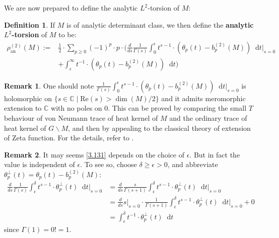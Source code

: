 \documentclass[11pt]{report}
\theoremstyle{definition}
\newtheorem{Def}{Definition}[chapter]
\newtheorem{Rmk}{Remark}[chapter]
\theoremstyle{plain}
\newcommand{\complex}{\mathbb{C}}
\newcommand{\mass}[1]{\mathop{}\mathrm{d}{#1}}
\renewcommand{\Re}{\mathrm{Re}}
\begin{document}
We are now prepared to define the analytic $L^2$-torsion of $M$:
\begin{Def}
	If $M$ is of analytic determinant class, we then define the \textbf{analytic $L^2$-torsion} of $M$ to be:
	\begin{equation}\label{3.131}
	\begin{split}
	\rho^{(2)}_{\mathrm{an}}(M):=&\frac{1}{2}\cdot \sum_{p\geq 0}(-1)^p\cdot p\cdot \Bigg(\frac{d}{ds}\frac{1}{\Gamma(s)}\int_{0}^{\epsilon}t^{s-1}\cdot \left(\theta_p(t)-b_p^{(2)}(M)\right)\mass{t}\Big|_{s=0}\\
	&+\int_{\epsilon}^{\infty}t^{-1}\cdot \left(\theta_p(t)-b_p^{(2)}(M)\right)\mass{t}\Bigg)
	\end{split}
	\end{equation}
\end{Def}
\begin{Rmk}
One should note $\frac{1}{\Gamma(s)}\int_{0}^{\epsilon}t^{s-1}\cdot \left(\theta_p(t)-b_p^{(2)}(M)\right)\mass{t}\Big|_{s=0}$ is holomorphic on $\{s\in \complex \mid \Re(s)>\dim(M)/2\}$ and it admits meromorphic extension to $\complex$ with no poles on $0$. This can be proved by comparing the small $T$ behaviour of von Neumann trace of heat kernel of $M$ and the ordinary trace of heat kernel of $G \backslash M$, and then by appealing to the classical theory of extension of Zeta function. For the details, refer to \cite[Lemma~3]{lott1992}.
\end{Rmk}
\begin{Rmk}
	It may seems \ref{3.131} depends on the choice of $\epsilon$. But in fact the value is independent of $\epsilon$. To see so, choose $\delta\geq \epsilon>0$, and abbreviate $\theta^\perp_p(t)=\theta_p(t)-b_p^{(2)}(M)$:
	\begin{equation*}
	\begin{split}
	\frac{d}{ds}\frac{1}{\Gamma(s)}\int_{\epsilon}^{\delta}t^{s-1}\cdot \theta_p^\perp(t)\mass{t}\Big|_{s=0}&=\frac{d}{ds}\frac{s}{\Gamma(s+1)}\int_{\epsilon}^{\delta}t^{s-1}\cdot \theta_p^\perp(t)\mass{t}\Big|_{s=0}\\
	&=\frac{d}{ds}s\Big|_{s=0}\cdot \frac{1}{\Gamma(s+1)}\int_{\epsilon}^{\delta}t^{s-1}\cdot \theta_p^\perp(t)\mass{t}\Big|_{s=0}+0\\
	&=\int_{\epsilon}^{\delta}t^{-1}\cdot \theta_p^\perp(t)\mass{t}
	\end{split}
	\end{equation*}
since $\Gamma(1)=0!=1$.
\end{Rmk}
\end{document}
